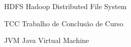 \begin{siglas}
  \item[HDFS] Hadoop Distributed File System
  \item[TCC] Trabalho de Conclusão de Curso
  \item[JVM] Java Virtual Machine
\end{siglas}
